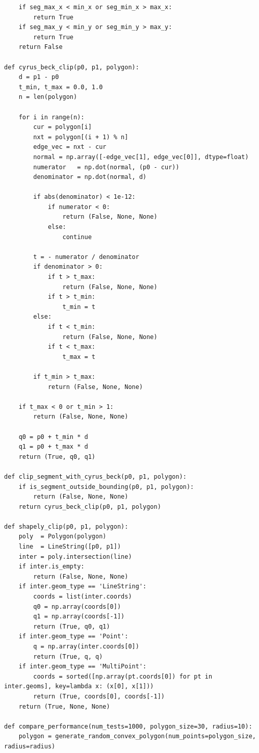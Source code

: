 \documentclass[areasetadvanced]{scrartcl}
\begin{document}
\begin{lstlisting}
    if seg_max_x < min_x or seg_min_x > max_x:
        return True
    if seg_max_y < min_y or seg_min_y > max_y:
        return True
    return False

def cyrus_beck_clip(p0, p1, polygon):
    d = p1 - p0
    t_min, t_max = 0.0, 1.0
    n = len(polygon)

    for i in range(n):
        cur = polygon[i]
        nxt = polygon[(i + 1) % n]
        edge_vec = nxt - cur
        normal = np.array([-edge_vec[1], edge_vec[0]], dtype=float)  
        numerator   = np.dot(normal, (p0 - cur))
        denominator = np.dot(normal, d)

        if abs(denominator) < 1e-12:
            if numerator < 0:
                return (False, None, None)  
            else:
                continue  

        t = - numerator / denominator
        if denominator > 0:
            if t > t_max:
                return (False, None, None)
            if t > t_min:
                t_min = t
        else:
            if t < t_min:
                return (False, None, None)
            if t < t_max:
                t_max = t

        if t_min > t_max:
            return (False, None, None)

    if t_max < 0 or t_min > 1:
        return (False, None, None)

    q0 = p0 + t_min * d
    q1 = p0 + t_max * d
    return (True, q0, q1)

def clip_segment_with_cyrus_beck(p0, p1, polygon):
    if is_segment_outside_bounding(p0, p1, polygon):
        return (False, None, None)
    return cyrus_beck_clip(p0, p1, polygon)

def shapely_clip(p0, p1, polygon):
    poly  = Polygon(polygon)
    line  = LineString([p0, p1])
    inter = poly.intersection(line)
    if inter.is_empty:
        return (False, None, None)
    if inter.geom_type == 'LineString':
        coords = list(inter.coords)
        q0 = np.array(coords[0])
        q1 = np.array(coords[-1])
        return (True, q0, q1)
    if inter.geom_type == 'Point':
        q = np.array(inter.coords[0])
        return (True, q, q)
    if inter.geom_type == 'MultiPoint':
        coords = sorted([np.array(pt.coords[0]) for pt in inter.geoms], key=lambda x: (x[0], x[1]))
        return (True, coords[0], coords[-1])
    return (True, None, None)

def compare_performance(num_tests=1000, polygon_size=30, radius=10):
    polygon = generate_random_convex_polygon(num_points=polygon_size, radius=radius)


\end{lstlisting}
\end{document}
